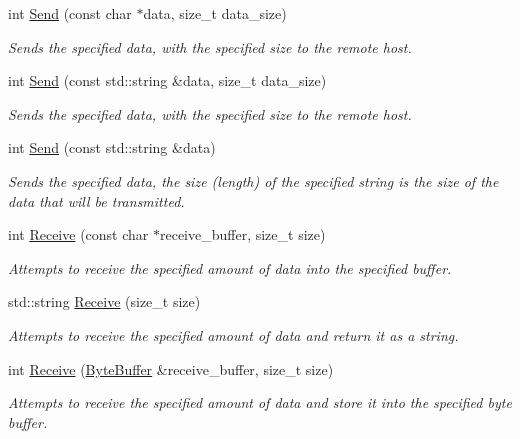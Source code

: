 \begin{DoxyCompactItemize}
int \hyperlink{class_senergy_1_1_networking_1_1_socket_a61bd1c30a7e0238b7a2d9b1db20685bb}{Send} (const char $\ast$data, size\-\_\-t data\-\_\-size)
\begin{DoxyCompactList}\small\item\em Sends the specified data, with the specified size to the remote host. \end{DoxyCompactList}\item 
int \hyperlink{class_senergy_1_1_networking_1_1_socket_a2a1d9af479c41fb2e9c12c696454f824}{Send} (const std\-::string \&data, size\-\_\-t data\-\_\-size)
\begin{DoxyCompactList}\small\item\em Sends the specified data, with the specified size to the remote host. \end{DoxyCompactList}\item 
int \hyperlink{class_senergy_1_1_networking_1_1_socket_a9e1382ced3780b0150e354fd115249d3}{Send} (const std\-::string \&data)
\begin{DoxyCompactList}\small\item\em Sends the specified data, the size (length) of the specified string is the size of the data that will be transmitted. \end{DoxyCompactList}\item 
int \hyperlink{class_senergy_1_1_networking_1_1_socket_abc6a27d4972efa3b7e103d94993190b7}{Receive} (const char $\ast$receive\-\_\-buffer, size\-\_\-t size)
\begin{DoxyCompactList}\small\item\em Attempts to receive the specified amount of data into the specified buffer. \end{DoxyCompactList}\item 
std\-::string \hyperlink{class_senergy_1_1_networking_1_1_socket_a535e4367070b4aa66d458d87fd1acf1b}{Receive} (size\-\_\-t size)
\begin{DoxyCompactList}\small\item\em Attempts to receive the specified amount of data and return it as a string. \end{DoxyCompactList}\item 
int \hyperlink{class_senergy_1_1_networking_1_1_socket_a77cdf17b5493e2f83cbb5ff46575823e}{Receive} (\hyperlink{class_senergy_1_1_byte_buffer}{Byte\-Buffer} \&receive\-\_\-buffer, size\-\_\-t size)
\begin{DoxyCompactList}\small\item\em Attempts to receive the specified amount of data and store it into the specified byte buffer. \end{DoxyCompactList}\item 

\end{DoxyCompactItemize}
